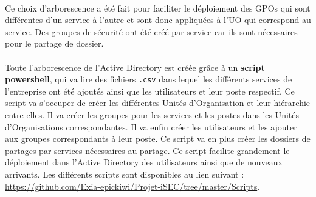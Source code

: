 		\paragraph{}
			Ce choix d'arborescence a été fait pour faciliter le déploiement des GPOs qui sont différentes d'un service à l'autre et sont donc appliquées à l'UO qui correspond au service. Des groupes de sécurité ont été créé par service car ils sont nécessaires pour le partage de dossier. 

		\paragraph{}
			Toute l'arborescence de l'Active Directory est créée grâce à un \textbf{script powershell}, qui va lire des fichiers \texttt{.csv} dans lequel les différents services de l'entreprise ont été ajoutés ainsi que les utilisateurs et leur poste respectif. Ce script va s'occuper de créer les différentes Unités d'Organisation et leur hiérarchie entre elles. Il va créer les groupes pour les services et les postes dans les Unités d'Organisations correspondantes. Il va enfin créer les utilisateurs et les ajouter aux groupes correspondants à leur poste. Ce script va en plus créer les dossiers de partages par services nécessaires au partage. Ce script facilite grandement le déploiement dans l'Active Directory des utilisateurs ainsi que de nouveaux arrivants. Les différents scripts sont disponibles au lien suivant : \href{https://github.com/Exia-epickiwi/Projet-iSEC/tree/master/Scripts}{https://github.com/Exia-epickiwi/Projet-iSEC/tree/master/Scripts}.